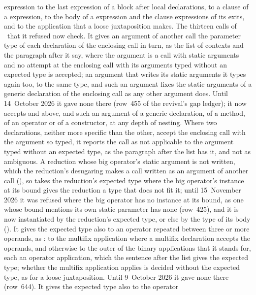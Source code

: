 \begin{description}
expression to the last expression of a block after local declarations, to a
clause of a  expression, to the body of a  expression
and the  clause expressions of its exits, and to the application that
a loose juxtaposition makes.
The thirteen calls of \library\ that it refused now check.
It gives an argument of another call the parameter type of each declaration of
the enclosing call in turn, as the list of contexts and the paragraph after it
say, where the argument is a call with static arguments and no attempt at the
enclosing call with its arguments typed without an expected type is accepted;
an argument that writes its static arguments it types again too, to the same
type, and such an argument fixes the static arguments of a generic declaration
of the enclosing call as any other argument does.
Until 14~October 2026 it gave none there (row~455 of the revival's gap ledger);
it now accepts  and
 above, and such an argument of a generic
declaration, of a method, of an operator or of a constructor, at any depth of
nesting.
Where two declarations, neither more specific than the other, accept the
enclosing call with the argument so typed, it reports the call as not
applicable to the argument typed without an expected type, as the paragraph
after the list has it, and not as ambiguous.
A reduction whose big operator's static argument is not written, which the
reduction's desugaring makes a call written as an argument of another call
(), so takes the reduction's expected type where the
big operator's instance at its bound gives the reduction a type that does not
fit it; until 15~November 2026 it was refused where the big operator has no
instance at its bound, as one whose bound mentions its own static parameter
has none (row~425), and it is now instantiated by the reduction's expected
type, or else by the type of its body ().
It gives the expected type also to an operator repeated between three or more
operands, as : to the multifix application where a
multifix declaration accepts the operands, and otherwise to the outer of the
binary applications  that it stands for, each an
operator application, which the sentence after the list gives the expected
type; whether the multifix application applies is decided without the expected
type, as for a loose juxtaposition.
Until 9~October 2026 it gave none there (row~644).
It gives the expected type also to the  operator

\end{description}
